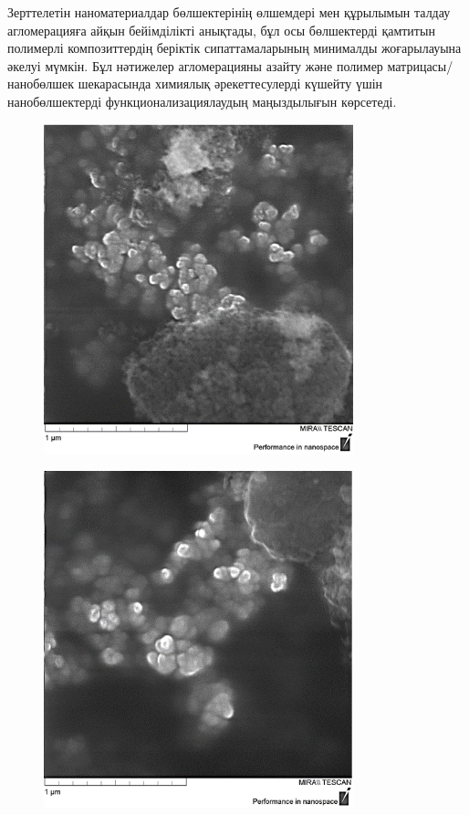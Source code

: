 \begin{multicols}{2}
Зерттелетін наноматериалдар бөлшектерінің өлшемдері мен құрылымын талдау
агломерацияға айқын бейімділікті анықтады, бұл осы бөлшектерді қамтитын
полимерлі композиттердің беріктік сипаттамаларының минималды
жоғарылауына әкелуі мүмкін. Бұл нәтижелер агломерацияны азайту және
полимер матрицасы/нанобөлшек шекарасында химиялық әрекеттесулерді
күшейту үшін нанобөлшектерді функционализациялаудың маңыздылығын
көрсетеді.
\end{multicols}

\begin{figure}[H]
	\centering
	\includegraphics[width=0.8\textwidth]{media/chem/image17}
	\caption*{}
\end{figure}

\begin{figure}[H]
	\centering
	\includegraphics[width=0.8\textwidth]{media/chem/image18}
	\caption*{}
\end{figure}


